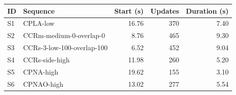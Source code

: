 \begin{tabular}{llrrr}
\toprule
ID & Sequence & Start (s) & Updates & Duration (s) \\
\midrule
S1 & CPLA-low & 16.76 & 370 & 7.40 \\
S2 & CCRm-medium-0-overlap-0 & 8.76 & 465 & 9.30 \\
S3 & CCRs-3-low-100-overlap-100 & 6.52 & 452 & 9.04 \\
S4 & CCRs-side-high & 11.98 & 260 & 5.20 \\
S5 & CPNA-high & 19.62 & 155 & 3.10 \\
S6 & CPNAO-high & 13.02 & 277 & 5.54 \\
\bottomrule
\end{tabular}
